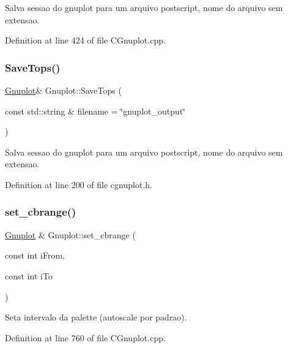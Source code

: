 Salva sessao do gnuplot para um arquivo postscript, nome do arquivo sem extensao. 



Definition at line 424 of file C\+Gnuplot.\+cpp.

\mbox{\label{class_gnuplot_a5adf74dfda6d9d70a16c435fedf07625}} 
\subsubsection{\texorpdfstring{Save\+Tops()}{SaveTops()}}
{\footnotesize\ttfamily \hyperlink{class_gnuplot}{Gnuplot}\& Gnuplot\+::\+Save\+Tops (\begin{DoxyParamCaption}\item[{const std\+::string \&}]{filename = {\ttfamily \char`\"{}gnuplot\+\_\+output\char`\"{}} }\end{DoxyParamCaption})\hspace{0.3cm}{\ttfamily [inline]}}



Salva sessao do gnuplot para um arquivo postscript, nome do arquivo sem extensao. 



Definition at line 200 of file cgnuplot.\+h.

\mbox{\label{class_gnuplot_a2c8c8ae0441f54dd728bc6594051c137}} 
\subsubsection{\texorpdfstring{set\+\_\+cbrange()}{set\_cbrange()}}
{\footnotesize\ttfamily \hyperlink{class_gnuplot}{Gnuplot} \& Gnuplot\+::set\+\_\+cbrange (\begin{DoxyParamCaption}\item[{const int}]{i\+From,  }\item[{const int}]{i\+To }\end{DoxyParamCaption})}



Seta intervalo da palette (autoscale por padrao). 



Definition at line 760 of file C\+Gnuplot.\+cpp.

\mbox{\label{class_gnuplot_af845efc728a90d7e10de764eff0b2423}} 
